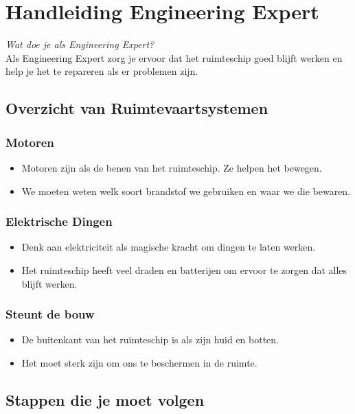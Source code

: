 \section{Handleiding Engineering Expert}

\textit{Wat doe je als Engineering Expert?} \\
Als Engineering Expert zorg je ervoor dat het ruimteschip goed blijft werken en help je het te repareren als er problemen zijn.

\subsection{Overzicht van Ruimtevaartsystemen}

\subsubsection{Motoren}
\begin{itemize}
    \item Motoren zijn als de benen van het ruimteschip. Ze helpen het bewegen.
    \item We moeten weten welk soort brandstof we gebruiken en waar we die bewaren.
\end{itemize}

\subsubsection{Elektrische Dingen}
\begin{itemize}
    \item Denk aan elektriciteit als magische kracht om dingen te laten werken.
    \item Het ruimteschip heeft veel draden en batterijen om ervoor te zorgen dat alles blijft werken.
\end{itemize}

\subsubsection{Steunt de bouw}
\begin{itemize}
    \item De buitenkant van het ruimteschip is als zijn huid en botten.
    \item Het moet sterk zijn om ons te beschermen in de ruimte.
\end{itemize}


\subsection{Stappen die je moet volgen}

